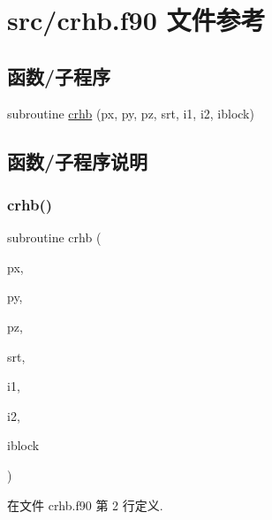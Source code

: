 \hypertarget{crhb_8f90}{}\section{src/crhb.f90 文件参考}
\label{crhb_8f90}
\subsection*{函数/子程序}
\begin{DoxyCompactItemize}
\item 
subroutine \mbox{\hyperlink{crhb_8f90_a4037a3f20db2ec862ab7310e76c4413e}{crhb}} (px, py, pz, srt, i1, i2, iblock)
\end{DoxyCompactItemize}


\subsection{函数/子程序说明}
\mbox{\label{crhb_8f90_a4037a3f20db2ec862ab7310e76c4413e}} 
\subsubsection{\texorpdfstring{crhb()}{crhb()}}
{\footnotesize\ttfamily subroutine crhb (\begin{DoxyParamCaption}\item[{}]{px,  }\item[{}]{py,  }\item[{}]{pz,  }\item[{}]{srt,  }\item[{}]{i1,  }\item[{}]{i2,  }\item[{}]{iblock }\end{DoxyParamCaption})}



在文件 crhb.\+f90 第 2 行定义.

